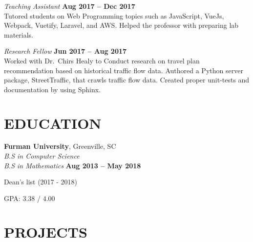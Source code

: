 \documentclass[margin,line]{resume}
\begin{document}
\begin{resume}
    \textsl{Teaching Assistant} \vspace{2mm}\hfill \textbf{Aug 2017 -- Dec 2017}\\
    Tutored students on Web Programming topics such as JavaScript, VueJs, Webpack, Vuetify, Laravel, and
    AWS. Helped the professor with preparing lab materials. \vspace{1mm}
    
    \textsl{Research Fellow} \vspace{2mm}\hfill \textbf{Jun 2017 -- Aug 2017}\\
    Worked with Dr.~Chirs Healy to Conduct research on travel plan recommendation based on historical traffic flow data. Authored a Python server package, StreetTraffic, that crawls traffic flow data. Created proper unit-tests and documentation by using Sphinx.




\sectionline

    \section{\mysidestyle \textbf{\large{E}\small{DUCATION}}}

    \textbf{\listing Furman University}, Greenville, SC \vspace{2mm}\\\vspace{1mm}%
    \textsl{B.S in Computer Science \\ B.S in Mathematics} \hfill \vspace{0.1cm} \textbf{ Aug 2013 -- May 2018}\vspace{-3mm}\\\vspace{-1mm}%
    \begin{list2}
        \item Dean's list (2017 - 2018)
        \item GPA: 3.38 / 4.00
    \end{list2}\vspace{-1.5mm}




\sectionline

    \section{\mysidestyle \textbf{\large{P}\small{ROJECTS}}}


\end{resume}
\end{document}

